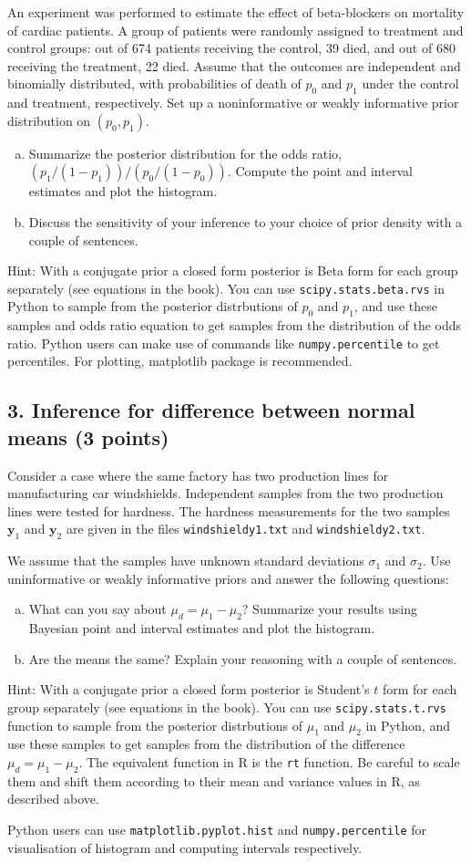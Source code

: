 \documentclass[a4paper,11pt]{article}
\begin{document}
An experiment was performed to estimate the effect of beta-blockers
on mortality of cardiac patients. A group of patients were randomly
assigned to treatment and control groups: out of 674 patients
receiving the control, 39 died, and out of 680 receiving the
treatment, 22 died. Assume that the outcomes are independent and
binomially distributed, with probabilities of death of $p_0$ and $p_1$
under the control and treatment, respectively. Set up a noninformative
or weakly informative prior distribution on $(p_0,p_1)$. 
\begin{enumerate}[a)]
\item Summarize the posterior distribution for the odds ratio, $(p_1/(1-p_1))/(p_0/(1-p_0))$. Compute the point and interval estimates and plot the histogram. 
\item Discuss the sensitivity of your inference
to your choice of prior density with a couple of sentences.
\end{enumerate}
Hint: With a conjugate prior a closed form posterior is Beta form for
each group separately (see equations in the book). You can use {\tt scipy.stats.beta.rvs} in Python
to sample from the posterior distrbutions of $p_0$ and $p_1$, and use
these samples and odds ratio equation to get samples from the
distribution of the odds ratio.
Python users can make use of commands like {\tt numpy.percentile} to get percentiles. For plotting, matplotlib package is recommended.

\subsection*{3. Inference for difference between normal means (3 points)}

Consider a case where the same factory has two production lines for
manufacturing car windshields. Independent samples from the two
production lines were tested for hardness. The hardness measurements
for the two samples $\mathbf{y}_1$ and $\mathbf{y}_2$ are given in the
files {\tt windshieldy1.txt} and {\tt windshieldy2.txt}.

We assume that the samples have unknown standard deviations $\sigma_1$
and $\sigma_2$. Use uninformative or weakly informative priors and
answer the following questions:
\begin{enumerate}[a)]
\item What can you say about $\mu_d = \mu_1 - \mu_2$? Summarize
  your results using Bayesian point and interval estimates and plot the histogram.     
\item Are the means the same? Explain your reasoning with a couple of sentences.
\end{enumerate}
Hint: With a conjugate prior a closed form posterior is Student's $t$
form for each group separately (see equations in the book). You can
use {\tt scipy.stats.t.rvs} function to sample from the posterior distrbutions of $\mu_1$ and
$\mu_2$ in Python, and use these samples to get samples from the distribution of
the difference $\mu_d = \mu_1 - \mu_2$. The equivalent function in R is the {\tt rt} function. Be careful to scale them and shift them according to their mean and variance values in R, as described above.

Python users can use {\tt matplotlib.pyplot.hist} and {\tt numpy.percentile} for visualisation of histogram and computing intervals respectively.
\end{document}
